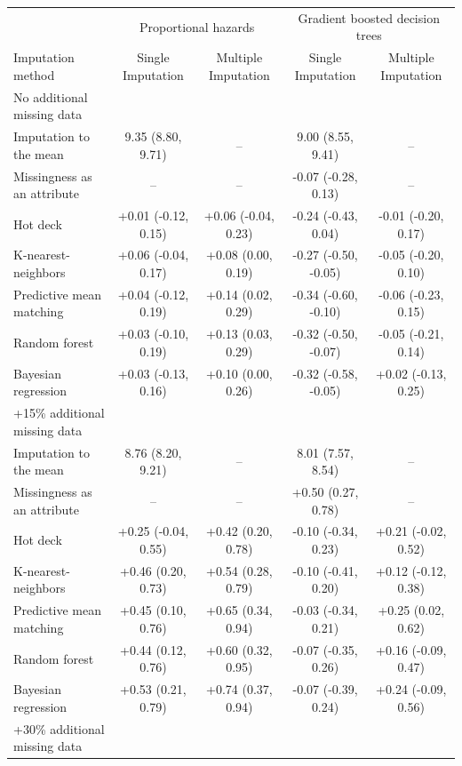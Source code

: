 \documentclass{article}
\begin{document}
\begin{table}
\begin{tabular}{lcccc}
\toprule
& \multicolumn{2}{c}{Proportional hazards} & \multicolumn{2}{c}{Gradient boosted decision trees} \\ 
 \cmidrule(lr){2-3}\cmidrule(lr){4-5}
Imputation method & Single Imputation & Multiple Imputation & Single Imputation & Multiple Imputation \\ 
\midrule
\multicolumn{1}{l}{No additional missing data} \\ 
\midrule
Imputation to the mean & 9.35 (8.80, 9.71) & -- & 9.00 (8.55, 9.41) & -- \\ 
Missingness as an attribute & -- & -- & -0.07 (-0.28, 0.13) & -- \\ 
Hot deck & +0.01 (-0.12, 0.15) & +0.06 (-0.04, 0.23) & -0.24 (-0.43, 0.04) & -0.01 (-0.20, 0.17) \\ 
K-nearest-neighbors & +0.06 (-0.04, 0.17) & +0.08 (0.00, 0.19) & -0.27 (-0.50, -0.05) & -0.05 (-0.20, 0.10) \\ 
Predictive mean matching & +0.04 (-0.12, 0.19) & +0.14 (0.02, 0.29) & -0.34 (-0.60, -0.10) & -0.06 (-0.23, 0.15) \\ 
Random forest & +0.03 (-0.10, 0.19) & +0.13 (0.03, 0.29) & -0.32 (-0.50, -0.07) & -0.05 (-0.21, 0.14) \\ 
Bayesian regression & +0.03 (-0.13, 0.16) & +0.10 (0.00, 0.26) & -0.32 (-0.58, -0.05) & +0.02 (-0.13, 0.25) \\ 
\midrule
\multicolumn{1}{l}{+15\% additional missing data} \\ 
\midrule
Imputation to the mean & 8.76 (8.20, 9.21) & -- & 8.01 (7.57, 8.54) & -- \\ 
Missingness as an attribute & -- & -- & +0.50 (0.27, 0.78) & -- \\ 
Hot deck & +0.25 (-0.04, 0.55) & +0.42 (0.20, 0.78) & -0.10 (-0.34, 0.23) & +0.21 (-0.02, 0.52) \\ 
K-nearest-neighbors & +0.46 (0.20, 0.73) & +0.54 (0.28, 0.79) & -0.10 (-0.41, 0.20) & +0.12 (-0.12, 0.38) \\ 
Predictive mean matching & +0.45 (0.10, 0.76) & +0.65 (0.34, 0.94) & -0.03 (-0.34, 0.21) & +0.25 (0.02, 0.62) \\ 
Random forest & +0.44 (0.12, 0.76) & +0.60 (0.32, 0.95) & -0.07 (-0.35, 0.26) & +0.16 (-0.09, 0.47) \\ 
Bayesian regression & +0.53 (0.21, 0.79) & +0.74 (0.37, 0.94) & -0.07 (-0.39, 0.24) & +0.24 (-0.09, 0.56) \\ 
\midrule
\multicolumn{1}{l}{+30\% additional missing data} \\ 

\end{tabular}
\end{table}
\end{document}
